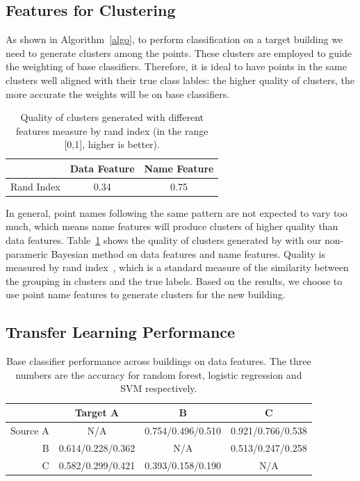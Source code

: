 \subsection{Features for Clustering}
As shown in Algorithm~\ref{algo}, to perform classification on a target building we need to generate clusters among the points.
These clusters are employed to guide the weighting of base classifiers. Therefore, it is ideal to have points in the same clusters 
well aligned with their true class lables: the higher quality of clusters, the more accurate the weights will be on base classifiers.


\begin{table}[h]
\centering
\begin{tabular}{l|c|c}
\hline
                & Data Feature & Name Feature \\ \hline
Rand Index & 0.34       & 0.75       \\ \hline
\end{tabular}
\caption{Quality of clusters generated with different features measure by rand index (in the range [0,1], higher is better).}
\label{quality}
\end{table}


In general, point names following the same pattern are not expected to vary too much, which means name features will produce clusters of higher quality than data features.
Table~\ref{quality} shows the quality of clusters generated by with our non-parameric Bayesian method on data features and name features. 
Quality is measured by rand index~\cite{rand}, which is a standard measure of the similarity between the grouping in clusters and the true labels.
Based on the results, we choose to use point name features to generate clusters for the new building. 


\subsection{Transfer Learning Performance}
\begin{table}[]
\centering
\begin{tabular}{r|c|c|c}
\hline
 & Target A     & B     & C     \\ \hline
Source A & N/A   & 0.754/0.496/0.510 & 0.921/0.766/0.538 \\ \hline
B & 0.614/0.228/0.362 & N/A   & 0.513/0.247/0.258 \\ \hline
C & 0.582/0.299/0.421 & 0.393/0.158/0.190 & N/A   \\ \hline
\end{tabular}
\caption{Base classifier performance across buildings on data features. The three numbers are the accuracy for random forest, logistic regression and SVM respectively.}
\label{acc_base}
\end{table}


